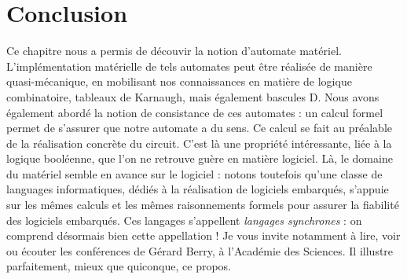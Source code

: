 \section{Conclusion}
Ce chapitre nous a permis de découvir la notion d'automate matériel.
L'implémentation matérielle de tels automates peut être réalisée de manière quasi-mécanique, en mobilisant nos connaissances
en matière de logique combinatoire, tableaux de Karnaugh, mais également bascules D. Nous avons également abordé la notion de consistance
de ces automates : un calcul formel permet de s'assurer que notre automate a du sens. Ce calcul se fait au préalable de la réalisation
concrète du circuit. C'est là une propriété intéressante, liée à la logique booléenne, que l'on ne retrouve guère en matière logiciel. Là, le domaine
du matériel semble en avance sur le logiciel : notons toutefois qu'une classe de languages informatiques, dédiés à la réalisation de logiciels embarqués,
s'appuie sur les mêmes calculs et les mêmes raisonnements formels pour assurer la fiabilité des logiciels embarqués. Ces langages s'appellent {\it langages synchrones} : on comprend
désormais bien cette appellation ! Je vous invite notamment à lire, voir ou écouter les conférences de Gérard Berry, à l'Académie des Sciences.
Il illustre parfaitement, mieux que quiconque, ce propos.
